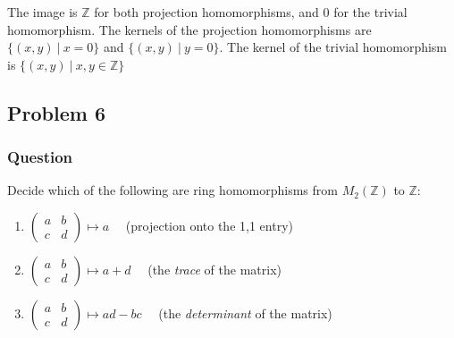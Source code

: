 \documentclass[12pt]{article}
\begin{document}
 The image is $\mathbb{Z}$ for both projection homomorphisms, and $0$ for the trivial homomorphism. The kernels of the projection homomorphisms are $\{(x,y)\ |\ x=0\}$ and $\{(x,y)\ |\ y=0\}$. The kernel of the trivial homomorphism is $\{(x,y)\ |\ x,y\in \mathbb{Z}\}$
 
 

\subsection{Problem 6}


\subsubsection{Question}
Decide which of the following are ring homomorphisms from $M_2 (\mathbb{Z})$ to $\mathbb{Z}$:
\begin{enumerate}
\item $\left( \begin{array}{lr} a&b\\c&d \end{array}\right) \mapsto a \quad $ (projection onto the 1,1 entry)
\item $\left( \begin{array}{lr} a&b\\c&d \end{array}\right) \mapsto a + d\quad $ (the \emph{trace} of the matrix)
\item $\left( \begin{array}{lr} a&b\\c&d \end{array}\right) \mapsto a d - bc \quad $ (the \emph{determinant} of the matrix)
\end{enumerate}
\end{document}
